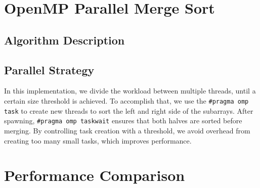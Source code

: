 \documentclass[12pt]{article}
\begin{document}
\section{OpenMP Parallel Merge Sort}

\subsection{Algorithm Description}
\noindent{}


\subsection{Parallel Strategy}
In this implementation, we divide the workload between multiple threads, until a certain size threshold is achieved.
To accomplish that, we use the \texttt{\#pragma omp task} to create new threads to sort the left and right side of the subarrays. After spawning, \texttt{\#pragma omp taskwait} ensures that both halves are sorted before merging.
By controlling task creation with a threshold, we avoid overhead from creating too many small tasks, which improves performance.


\section{Performance Comparison}
\end{document}
